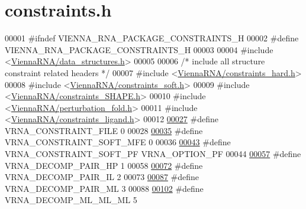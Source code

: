 \hypertarget{constraints_8h_source}{}\section{constraints.\+h}
\label{constraints_8h_source}

\begin{DoxyCode}
00001 \textcolor{preprocessor}{#ifndef VIENNA\_RNA\_PACKAGE\_CONSTRAINTS\_H}
00002 \textcolor{preprocessor}{#define VIENNA\_RNA\_PACKAGE\_CONSTRAINTS\_H}
00003 
00004 \textcolor{preprocessor}{#include <\hyperlink{data__structures_8h}{ViennaRNA/data\_structures.h}>}
00005 
00006 \textcolor{comment}{/* include all structure constraint related headers */}
00007 \textcolor{preprocessor}{#include <\hyperlink{constraints__hard_8h}{ViennaRNA/constraints\_hard.h}>}
00008 \textcolor{preprocessor}{#include <\hyperlink{constraints__soft_8h}{ViennaRNA/constraints\_soft.h}>}
00009 \textcolor{preprocessor}{#include <\hyperlink{constraints__SHAPE_8h}{ViennaRNA/constraints\_SHAPE.h}>}
00010 \textcolor{preprocessor}{#include <\hyperlink{perturbation__fold_8h}{ViennaRNA/perturbation\_fold.h}>}
00011 \textcolor{preprocessor}{#include <\hyperlink{constraints__ligand_8h}{ViennaRNA/constraints\_ligand.h}>}
00012 
\hypertarget{constraints_8h_source.tex_l00027}{}\hyperlink{group__constraints_ga62e0ed0c33002c09423de4e646f85a2b}{00027} \textcolor{preprocessor}{#define VRNA\_CONSTRAINT\_FILE      0}
00028 
\hypertarget{constraints_8h_source.tex_l00035}{}\hyperlink{group__constraints_ga62aa195893d02d1a79ca94952748df36}{00035} \textcolor{preprocessor}{#define VRNA\_CONSTRAINT\_SOFT\_MFE  0}
00036 
\hypertarget{constraints_8h_source.tex_l00043}{}\hyperlink{group__constraints_ga03fb5000c19b9a2082bf4ea30a543045}{00043} \textcolor{preprocessor}{#define VRNA\_CONSTRAINT\_SOFT\_PF   VRNA\_OPTION\_PF}
00044 
\hypertarget{constraints_8h_source.tex_l00057}{}\hyperlink{group__constraints_ga8bd41ebc8039378d242e4e8c273716a5}{00057} \textcolor{preprocessor}{#define VRNA\_DECOMP\_PAIR\_HP     1}
00058 
\hypertarget{constraints_8h_source.tex_l00072}{}\hyperlink{group__constraints_gaeab04f34d7730cff2d651d782f95d857}{00072} \textcolor{preprocessor}{#define VRNA\_DECOMP\_PAIR\_IL     2}
00073 
\hypertarget{constraints_8h_source.tex_l00087}{}\hyperlink{group__constraints_gaa15b1185673f0b9e900c4748d45f388f}{00087} \textcolor{preprocessor}{#define VRNA\_DECOMP\_PAIR\_ML     3}
00088 
\hypertarget{constraints_8h_source.tex_l00102}{}\hyperlink{group__constraints_ga735517266f2e35e1374b8f1ea77ef23e}{00102} \textcolor{preprocessor}{#define VRNA\_DECOMP\_ML\_ML\_ML    5}

\end{DoxyCode}
